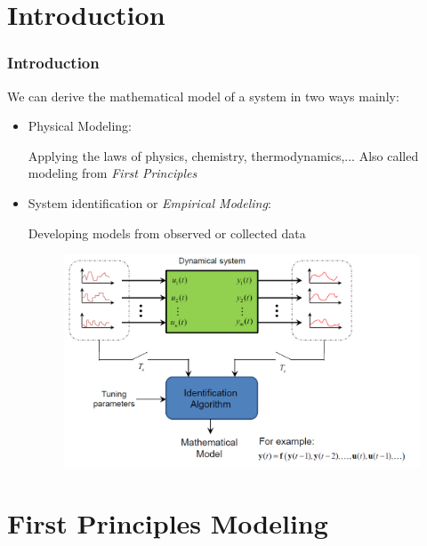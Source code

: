 \section{Introduction}
\begin{frame}
\frametitle{Introduction}
We can derive the mathematical model of a system in two ways mainly:
\begin{itemize}
	\item Physical Modeling: 
	
	Applying the laws of physics, chemistry, thermodynamics,...
	Also called modeling from \emph{First Principles}
	
	\pause 
	
	\item  System identification or \emph{Empirical Modeling}:
	
	Developing models from observed or collected data
	\begin{figure}
	\centering
	\includegraphics[width=0.7\linewidth]{img/system-identification}
	\label{fig:system-identification}
	\end{figure}

\end{itemize}
\end{frame}


\section{First Principles Modeling}


